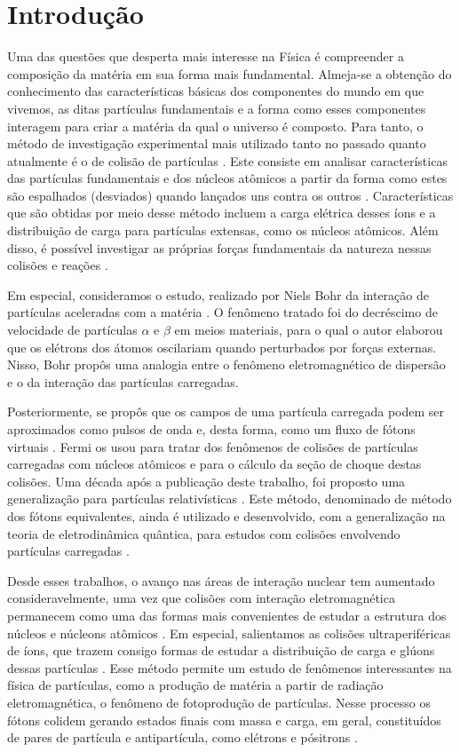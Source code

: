\chapter{Introdução}

Uma das questões que desperta mais interesse na Física é compreender a
composição da matéria em sua forma mais fundamental.  Almeja-se a obtenção do
conhecimento das características básicas dos componentes do mundo em que
vivemos, as ditas partículas fundamentais e a forma como esses componentes
interagem para criar a matéria da qual o universo é composto. Para tanto, o
método de investigação experimental mais utilizado tanto no passado quanto
atualmente é o de colisão de partículas \cite{griffiths_particle}. Este
consiste em analisar características das partículas fundamentais e dos núcleos
atômicos a partir da forma como estes são espalhados (desviados) quando
lançados uns contra os outros \cite{thomson_particle}.  Características que são
obtidas por meio desse método incluem a carga elétrica desses íons e a
distribuição de carga para partículas extensas, como os núcleos atômicos. Além
disso, é possível investigar as próprias forças fundamentais da natureza nessas
colisões e reações \cite{griffiths_particle}.

Em especial, consideramos o estudo, realizado por Niels Bohr da interação de
partículas aceleradas com a matéria \cite{bohr1913}. O fenômeno tratado foi do
decréscimo de velocidade de partículas $\alpha$ e $\beta$ em meios materiais,
para o qual o autor elaborou que os elétrons dos átomos oscilariam quando
perturbados por forças externas. Nisso, Bohr propôs uma analogia entre o
fenômeno eletromagnético de dispersão e o da interação das partículas
carregadas.

Posteriormente, se propôs que os campos de uma partícula carregada podem ser
aproximados como pulsos de onda e, desta forma, como um fluxo de fótons
virtuais \cite{Fermi1924}. Fermi os usou para tratar dos fenômenos de colisões
de partículas carregadas com núcleos atômicos e para o cálculo da seção de
choque destas colisões. Uma década após a publicação deste trabalho, foi
proposto uma generalização para partículas relativísticas \cite{williams1933}.
Este método, denominado de método dos fótons equivalentes, ainda é utilizado e
desenvolvido, com a generalização na teoria de eletrodinâmica quântica, para
estudos com colisões envolvendo partículas carregadas \cite{BALTZ20081}.

Desde esses trabalhos, o avanço nas áreas de interação nuclear tem aumentado
consideravelmente, uma vez que colisões com interação eletromagnética
permanecem como uma das formas mais convenientes de estudar a estrutura dos
núcleos e núcleons atômicos \cite{harland-lang2023}. Em especial, salientamos
as colisões ultraperiféricas de íons, que trazem consigo formas de estudar a
distribuição de carga e glúons dessas partículas \cite{bertulani2005}. Esse
método permite um estudo de fenômenos interessantes na física de partículas,
como a produção de matéria a partir de radiação eletromagnética, o fenômeno de
fotoprodução de partículas. Nesse processo os fótons colidem gerando estados
finais com massa e carga, em geral, constituídos de pares de partícula e
antipartícula, como elétrons e pósitrons \cite{Gerhard_Baur_1998}.

